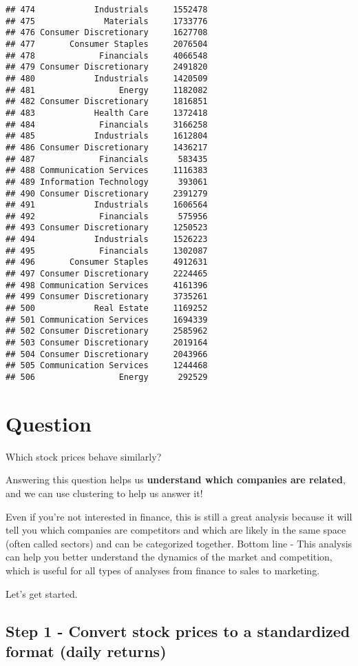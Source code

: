 \documentclass[
]{article}
\begin{document}
\begin{verbatim}
## 474            Industrials     1552478
## 475              Materials     1733776
## 476 Consumer Discretionary     1627708
## 477       Consumer Staples     2076504
## 478             Financials     4066548
## 479 Consumer Discretionary     2491820
## 480            Industrials     1420509
## 481                 Energy     1182082
## 482 Consumer Discretionary     1816851
## 483            Health Care     1372418
## 484             Financials     3166258
## 485            Industrials     1612804
## 486 Consumer Discretionary     1436217
## 487             Financials      583435
## 488 Communication Services     1116383
## 489 Information Technology      393061
## 490 Consumer Discretionary     2391279
## 491            Industrials     1606564
## 492             Financials      575956
## 493 Consumer Discretionary     1250523
## 494            Industrials     1526223
## 495             Financials     1302087
## 496       Consumer Staples     4912631
## 497 Consumer Discretionary     2224465
## 498 Communication Services     4161396
## 499 Consumer Discretionary     3735261
## 500            Real Estate     1169252
## 501 Communication Services     1694339
## 502 Consumer Discretionary     2585962
## 503 Consumer Discretionary     2019164
## 504 Consumer Discretionary     2043966
## 505 Communication Services     1244468
## 506                 Energy      292529
\end{verbatim}

\hypertarget{question}{%
\section{Question}\label{question}}

Which stock prices behave similarly?

Answering this question helps us \textbf{understand which companies are
related}, and we can use clustering to help us answer it!

Even if you're not interested in finance, this is still a great analysis
because it will tell you which companies are competitors and which are
likely in the same space (often called sectors) and can be categorized
together. Bottom line - This analysis can help you better understand the
dynamics of the market and competition, which is useful for all types of
analyses from finance to sales to marketing.

Let's get started.

\hypertarget{step-1---convert-stock-prices-to-a-standardized-format-daily-returns}{%
\subsection{Step 1 - Convert stock prices to a standardized format
(daily
returns)}\label{step-1---convert-stock-prices-to-a-standardized-format-daily-returns}}
\end{document}
